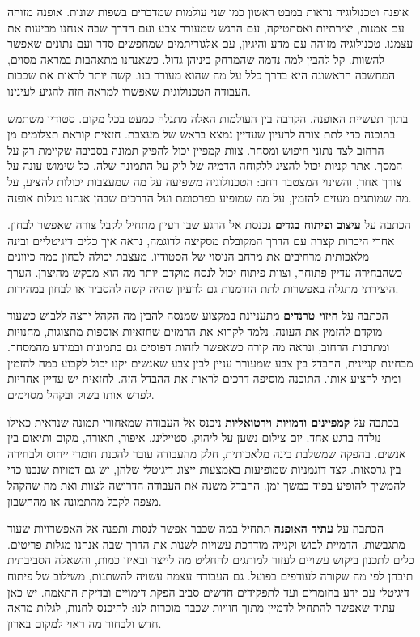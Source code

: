 
{\fontsize{13.1}{18.7}\selectfont

אופנה וטכנולוגיה נראות במבט ראשון כמו שני עולמות שמדברים בשפות שונות. אופנה מזוהה עם אמנות, יצירתיות ואסתטיקה, עם הרגש שמעורר צבע ועם הדרך שבה אנחנו מביעות את עצמנו. טכנולוגיה מזוהה עם מדע והיגיון, עם אלגוריתמים שמחפשים סדר ועם נתונים שאפשר להשוות. קל להבין למה נדמה שהמרחק ביניהן גדול. כשאנחנו מתאהבות במראה מסוים, המחשבה הראשונה היא בדרך כלל על מה שהוא מעורר בנו. קשה יותר לראות את שכבות העבודה הטכנולוגית שאפשרו למראה הזה להגיע לעינינו.

בתוך תעשיית האופנה, הקרבה בין העולמות האלה מתגלה כמעט בכל מקום. סטודיו משתמש בתוכנה כדי לתת צורה לרעיון שעדיין נמצא בראש של מעצבת. חזאית קוראת תצלומים מן הרחוב לצד נתוני חיפוש ומסחר. צוות קמפיין יכול להפיק תמונה בסביבה שקיימת רק על המסך. אתר קניות יכול להציג ללקוחה הדמיה של לוק על התמונה שלה. כל שימוש עונה על צורך אחר, והשינוי המצטבר רחב: הטכנולוגיה משפיעה על מה שמעצבות יכולות להציע, על מה שמותגים מעזים להזמין, על מה שמופיע בפרסומת ועל הדרכים שבהן אנחנו מגלות אופנה.

הכתבה על \textbf{עיצוב ופיתוח בגדים} נכנסת אל הרגע שבו רעיון מתחיל לקבל צורה שאפשר לבחון. אחרי היכרות קצרה עם הדרך המקובלת מסקיצה לדוגמה, נראה איך כלים דיגיטליים ובינה מלאכותית מרחיבים את מרחב הניסוי של הסטודיו. מעצבת יכולה לבחון כמה כיוונים כשהבחירה עדיין פתוחה, וצוות פיתוח יכול לנסח מוקדם יותר מה הוא מבקש מהיצרן. הערך היצירתי מתגלה באפשרות לתת הזדמנות גם לרעיון שהיה קשה להסביר או לבחון במהירות.

הכתבה על \textbf{חיזוי טרנדים} מתעניינת במקצוע שמנסה להבין מה הקהל ירצה ללבוש כשעוד מוקדם להזמין את העונה. נלמד לקרוא את הרמזים שחזאיות אוספות מתצוגות, מחנויות ומתרבות הרחוב, ונראה מה קורה כשאפשר לזהות דפוסים גם בתמונות ובמידע מהמסחר. מבחינת קניינית, ההבדל בין צבע שמעורר עניין לבין צבע שאנשים יקנו יכול לקבוע כמה להזמין ומתי להציע אותו. התוכנה מוסיפה דרכים לראות את ההבדל הזה. לחזאית יש עדיין אחריות לפרש אותו בשוק ובקהל מסוימים.

בכתבה על \textbf{קמפיינים ודמויות וירטואליות} ניכנס אל העבודה שמאחורי תמונה שנראית כאילו נולדה ברגע אחד. יום צילום נשען על ליהוק, סטיילינג, איפור, תאורה, מקום ותיאום בין אנשים. בהפקה שמשלבת בינה מלאכותית, חלק מהעבודה עובר להכנת חומרי ייחוס ולבחירה בין גרסאות. לצד דוגמניות שמופיעות באמצעות ייצוג דיגיטלי שלהן, יש גם דמויות שנבנו כדי להמשיך להופיע בפיד במשך זמן. ההבדל משנה את העבודה הדרושה לצוות ואת מה שהקהל מצפה לקבל מהתמונה או מהחשבון.

הכתבה על \textbf{עתיד האופנה} תתחיל במה שכבר אפשר לנסות ותפנה אל האפשרויות שעוד מתגבשות. הדמיית לבוש וקנייה מודרכת עשויות לשנות את הדרך שבה אנחנו מגלות פריטים. כלים לתכנון ביקוש עשויים לעזור למותגים להחליט מה לייצר ובאיזו כמות, והשאלה הסביבתית תיבחן לפי מה שקורה לעודפים בפועל. גם העבודה עצמה עשויה להשתנות, משילוב של פיתוח דיגיטלי עם ידע בחומרים ועד לתפקידים חדשים סביב הפקת דימויים ובדיקת התאמה. יש כאן עתיד שאפשר להתחיל לדמיין מתוך חוויות שכבר מוכרות לנו: להיכנס לחנות, לגלות מראה חדש ולבחור מה ראוי למקום בארון.

\par}
